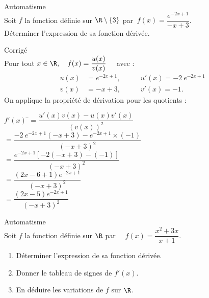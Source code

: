 \documentclass[a4paper,11pt,exos]{nsi} %
\newcounter{autNum}
\newcommand{\aut}[1]
{
	\addtocounter{autNum}{1}
	{\titlefont\color{UGLiBlue}\Large Automatisme\ \theautNum\ \normalsize{#1}}\smallskip	
}
\newcounter{corNum}
\newcommand{\cor}[1]
{
	\addtocounter{corNum}{1}
	{\titlefont\color{UGLiOrange}\Large Corrigé\ \thecorNum\ \normalsize{#1}}\smallskip	
}
\begin{document}
\vspace*{.5cm}

\aut{}\\%
Soit $f$ la fonction définie sur $\R\setminus\left\{3\right\}$ par $\ f(x)=\dfrac{e^{-2x+1}}{-x+3}$.\\[.5em]
Déterminer l'expression de sa fonction dérivée.\\

\cor{}\\
Pour tout $x\in  \R, \quad f(x)=\dfrac{u(x)}{v(x)}\quad$ avec :
\[\begin{aligned}u(x)&=e^{-2x+1},\qquad &u'(x)=-2\ e^{-2x+1}\\ v(x)&=-x+3, &v'(x)=-1.\end{aligned}\]
On applique la propriété de dérivation pour les quotients :
\newpage
\begin{tabbing}
	$f'(x)$	\=$=\dfrac{u'(x)v(x)-u(x)v'(x)}{\left(v(x)\right)^2}$\\[.5em]
	\>	$=\dfrac{-2\ e^{-2x+1}\left(-x+3\right)-e^{-2x+1}\times (-1)}{\left(-x+3\right)^2}$\\[.5em]
	\>	$=\dfrac{e^{-2x+1}\left[-2(-x+3)-(-1)\right]}{\left(-x+3\right)^2}$\\[.5em]
	\>	$=\dfrac{\left(2x-6+1\right)e^{-2x+1}}{\left(-x+3\right)^2}$\\[.5em]
	\>	$=\dfrac{\left(2x-5\right)e^{-2x+1}}{\left(-x+3\right)^2}$
\end{tabbing}

\vspace*{.5cm}
\aut{}\\
Soit $f$ la fonction définie sur $\R$ par $\quad f(x)=\dfrac{x^2+3x}{x+1}$.
\begin{enumerate}
	\item Déterminer l'expression de sa fonction dérivée.
	\item Donner le tableau de signes de $f'(x)$.
	\item En déduire les variations de $f$ sur $\R$.
\end{enumerate}
\end{document}
